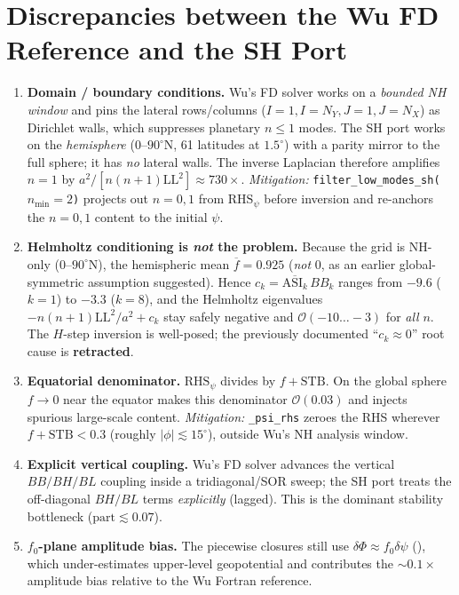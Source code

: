 \section{Discrepancies between the Wu FD Reference and the SH Port}
\label{sec:wu_discrepancies}

\begin{enumerate}[leftmargin=1.4em]
\item \textbf{Domain / boundary conditions.}  Wu's FD solver works on a
  \emph{bounded NH window} and pins the lateral rows/columns
  ($I{=}1,I{=}N_Y,J{=}1,J{=}N_X$) as Dirichlet walls, which suppresses
  planetary $n\!\le\!1$ modes.  The SH port works on the \emph{hemisphere}
  ($0$--$90^\circ$N, 61 latitudes at $1.5^\circ$) with a parity mirror to
  the full sphere; it has \emph{no} lateral walls.  The inverse Laplacian
  therefore amplifies $n{=}1$ by $a^2/[n(n{+}1)\mathrm{LL}^2]\approx 730\times$.
  \emph{Mitigation:} \texttt{filter\_low\_modes\_sh($n_{\min}{=}2$)}
  projects out $n{=}0,1$ from $\text{RHS}_\psi$ before inversion and
  re-anchors the $n{=}0,1$ content to the initial $\psi$.

\item \textbf{Helmholtz conditioning is \emph{not} the problem.}  Because
  the grid is NH-only ($0$--$90^\circ$N), the hemispheric mean
  $\overline{f}=0.925$ (\emph{not} $0$, as an earlier global-symmetric
  assumption suggested).  Hence
  $c_k=\overline{\mathrm{ASI}_k}\,BB_k$ ranges from $-9.6$ ($k{=}1$) to
  $-3.3$ ($k{=}8$), and the Helmholtz eigenvalues $-n(n{+}1)\mathrm{LL}^2/a^2+c_k$
  stay safely negative and $\mathcal{O}(-10\ldots -3)$ for \emph{all} $n$.
  The $H$-step inversion is well-posed; the previously documented
  ``$c_k\approx 0$'' root cause is \textbf{retracted}.

\item \textbf{Equatorial denominator.}  $\text{RHS}_\psi$ divides by
  $f+\mathrm{STB}$.  On the global sphere $f\!\to\!0$ near the equator
  makes this denominator $\mathcal{O}(0.03)$ and injects spurious
  large-scale content.  \emph{Mitigation:} \texttt{\_psi\_rhs} zeroes the
  RHS wherever $f+\mathrm{STB}<0.3$ (roughly $|\phi|\lesssim 15^\circ$),
  outside Wu's NH analysis window.

\item \textbf{Explicit vertical coupling.}  Wu's FD solver advances the
  vertical $BB/BH/BL$ coupling inside a tridiagonal/SOR sweep; the SH
  port treats the off-diagonal $BH/BL$ terms \emph{explicitly} (lagged).
  This is the dominant stability bottleneck ($\mathrm{part}\lesssim0.07$).

\item \textbf{$f_0$-plane amplitude bias.}  The piecewise closures still
  use $\delta\Phi\approx f_0\delta\psi$ (), which
  under-estimates upper-level geopotential and contributes the
  $\sim\!0.1\times$ amplitude bias relative to the Wu Fortran reference.
\end{enumerate}

